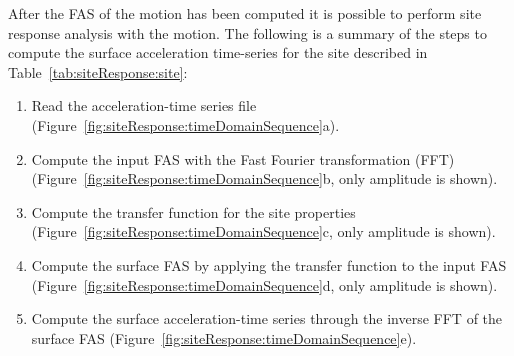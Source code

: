 \documentclass[12pt,oneside]{book}
\begin{document}
After the FAS of the motion has been computed it is possible to perform site response
analysis with the motion.  The following is a summary of the steps to compute the surface
acceleration time-series for the site described in Table~\ref{tab:siteResponse:site}:
\begin{enumerate}
    \item Read the acceleration-time series file (Figure~\ref{fig:siteResponse:timeDomainSequence}a).
    \item Compute the input FAS with the Fast Fourier transformation (FFT)
        (Figure~\ref{fig:siteResponse:timeDomainSequence}b, only amplitude is shown).
    \item Compute the transfer function for the site properties
        (Figure~\ref{fig:siteResponse:timeDomainSequence}c, only amplitude is shown).
    \item Compute the surface FAS by applying the transfer function to the input FAS
        (Figure~\ref{fig:siteResponse:timeDomainSequence}d, only amplitude is shown).
    \item Compute the surface acceleration-time series through the inverse FFT of the surface FAS
        (Figure~\ref{fig:siteResponse:timeDomainSequence}e).
\end{enumerate}
\end{document}
